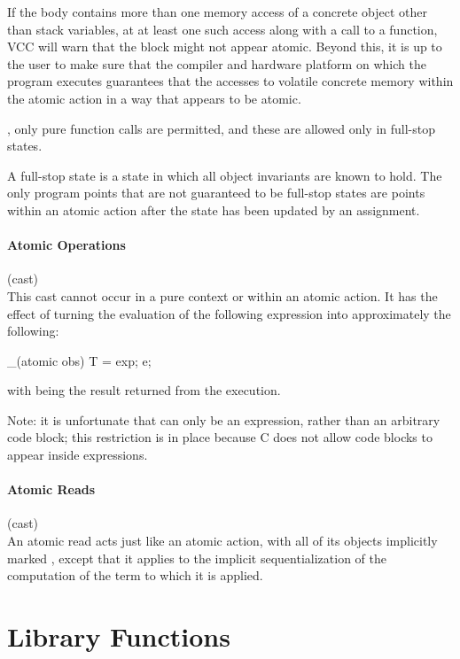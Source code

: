 \documentclass[preprint,nocopyrightspace]{sigplanconf}
\newcommand{\subsubsubsection}[1]{\paragraph{#1}}
\begin{document}
{{{If the body contains more than one memory access of a concrete object
other than stack variables, at at least one such access along with a
call to a  function, VCC will warn that the block might
not appear atomic. Beyond this, it is up to the user to make sure that the
compiler and hardware platform on which the program executes guarantees that 
the accesses to volatile concrete memory within the
atomic action in a way that appears to be atomic. 

, only pure function calls are permitted, and 
these are allowed only in full-stop states. 

A full-stop state is a state in which all object invariants are known
to hold. The only program points that are not guaranteed to be
full-stop states are points within an atomic action after the state
has been updated by an assignment.

\subsubsubsection{Atomic Operations}

\noindent{} (cast)\\
This cast cannot occur in a pure context or within an atomic action.
It has the effect of turning the evaluation of the following
expression  into approximately the following:
\begin{VCC}
_(atomic obs) {
  T \result = exp;
  e;
}
\end{VCC}
with \vcc{\result} being the result returned from the execution. 

Note: it is unfortunate that  can only be an expression, rather
than an arbitrary code block; this restriction is in place because C
does not allow code blocks to appear inside expressions. 

\subsubsubsection{Atomic Reads}

 (cast)\\
An atomic read acts just like an atomic action, with all of its
objects implicitly marked , except that it applies
to the implicit sequentialization of the computation of the term to
which it is applied.

\section{Library Functions}

}}}
\end{document}
